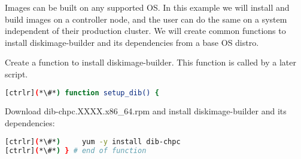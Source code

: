 
	Images can be built on any supported OS. In this example we will install and build images on a controller node, and the user can do the same on a system independent of their production cluster. We will create common functions to install diskimage-builder and its dependencies from a base OS distro.

	Create a function to install diskimage-builder. This function is called by a later script. 

\begin{lstlisting}[language=bash,keywords={}]
[ctrlr](*\#*) function setup_dib() {
\end{lstlisting}
	Download dib-chpc.XXXX.x86\_64.rpm and install diskimage-builder and its dependencies:
\begin{lstlisting}[language=bash,keywords={}]
[ctrlr](*\#*)     yum -y install dib-chpc
[ctrlr](*\#*) } # end of function
\end{lstlisting}
